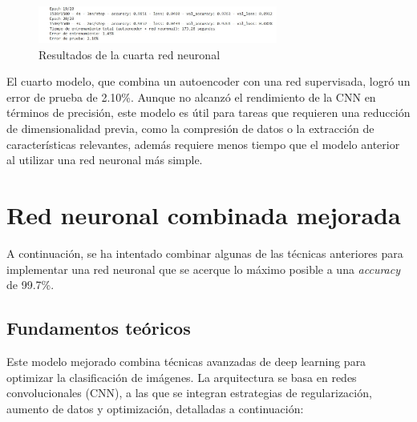 \begin{figure}[H]
	\centering
	\includegraphics[width=0.7\textwidth]{imgs/results-red4.JPG}
	\caption{Resultados de la cuarta red neuronal}
	\label{fig:results-red4}
\end{figure}

El cuarto modelo, que combina un autoencoder con una red supervisada, logró un error de prueba de 2.10\%. Aunque no alcanzó el rendimiento de la CNN en términos de precisión, este modelo es útil para tareas que requieren una reducción de dimensionalidad previa, como la compresión de datos o la extracción de características relevantes, además requiere menos tiempo que el modelo anterior al utilizar una red neuronal más simple.


\section{Red neuronal combinada mejorada}

A continuación, se ha intentado combinar algunas de las técnicas anteriores para implementar una red neuronal que se acerque lo máximo posible a una \textit{accuracy} de 99.7\%.

\subsection{Fundamentos teóricos}

Este modelo mejorado combina técnicas avanzadas de deep learning para optimizar la clasificación de imágenes. La arquitectura se basa en redes convolucionales (CNN), a las que se integran estrategias de regularización, aumento de datos y optimización, detalladas a continuación:

